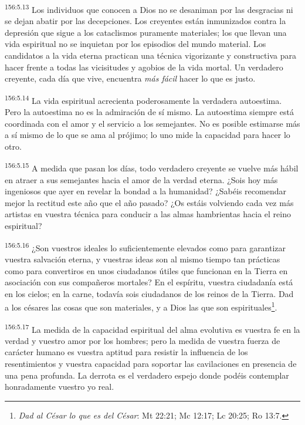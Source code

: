 \par 
\textsuperscript{156:5.13} Los individuos que conocen a Dios no se desaniman por las desgracias ni se dejan abatir por las decepciones. Los creyentes están inmunizados contra la depresión que sigue a los cataclismos puramente materiales; los que llevan una vida espiritual no se inquietan por los episodios del mundo material. Los candidatos a la vida eterna practican una técnica vigorizante y constructiva para hacer frente a todas las vicisitudes y agobios de la vida mortal. Un verdadero creyente, cada día que vive, encuentra \textit{más fácil} hacer lo que es justo.

\par 
\textsuperscript{156:5.14} La vida espiritual acrecienta poderosamente la verdadera autoestima. Pero la autoestima no es la admiración de sí mismo. La autoestima siempre está coordinada con el amor y el servicio a los semejantes. No es posible estimarse más a sí mismo de lo que se ama al prójimo; lo uno mide la capacidad para hacer lo otro.

\par 
\textsuperscript{156:5.15} A medida que pasan los días, todo verdadero creyente se vuelve más hábil en atraer a sus semejantes hacia el amor de la verdad eterna. ¿Sois hoy más ingeniosos que ayer en revelar la bondad a la humanidad? ¿Sabéis recomendar mejor la rectitud este año que el año pasado? ¿Os estáis volviendo cada vez más artistas en vuestra técnica para conducir a las almas hambrientas hacia el reino espiritual?

\par 
\textsuperscript{156:5.16} ¿Son vuestros ideales lo suficientemente elevados como para garantizar vuestra salvación eterna, y vuestras ideas son al mismo tiempo tan prácticas como para convertiros en unos ciudadanos útiles que funcionan en la Tierra en asociación con sus compañeros mortales? En el espíritu, vuestra ciudadanía está en los cielos; en la carne, todavía sois ciudadanos de los reinos de la Tierra. Dad a los césares las cosas que son materiales, y a Dios las que son espirituales\footnote{\textit{Dad al César lo que es del César}: Mt 22:21; Mc 12:17; Lc 20:25; Ro 13:7.}.

\par 
\textsuperscript{156:5.17} La medida de la capacidad espiritual del alma evolutiva es vuestra fe en la verdad y vuestro amor por los hombres; pero la medida de vuestra fuerza de carácter humano es vuestra aptitud para resistir la influencia de los resentimientos y vuestra capacidad para soportar las cavilaciones en presencia de una pena profunda. La derrota es el verdadero espejo donde podéis contemplar honradamente vuestro yo real.


